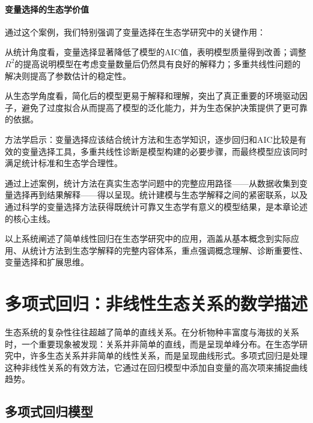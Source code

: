 \documentclass[
  twoside,12pt,fontset=none]{ctexbook}
\begin{document}
\hypertarget{ux53d8ux91cfux9009ux62e9ux7684ux751fux6001ux5b66ux4ef7ux503c}{%
\paragraph{变量选择的生态学价值}\label{ux53d8ux91cfux9009ux62e9ux7684ux751fux6001ux5b66ux4ef7ux503c}}

通过这个案例，我们特别强调了变量选择在生态学研究中的关键作用：

从统计角度看，变量选择显著降低了模型的AIC值，表明模型质量得到改善；调整\(R^2\)的提高说明模型在考虑变量数量后仍然具有良好的解释力；多重共线性问题的解决则提高了参数估计的稳定性。

从生态学角度看，简化后的模型更易于解释和理解，突出了真正重要的环境驱动因子，避免了过度拟合从而提高了模型的泛化能力，并为生态保护决策提供了更可靠的依据。

方法学启示：变量选择应该结合统计方法和生态学知识，逐步回归和AIC比较是有效的变量选择工具，多重共线性诊断是模型构建的必要步骤，而最终模型应该同时满足统计标准和生态学合理性。

通过上述案例，统计方法在真实生态学问题中的完整应用路径------从数据收集到变量选择再到结果解释------得以呈现。统计建模与生态学解释之间的紧密联系，以及通过科学的变量选择方法获得既统计可靠又生态学有意义的模型结果，是本章论述的核心主线。

以上系统阐述了简单线性回归在生态学研究中的应用，涵盖从基本概念到实际应用、从统计方法到生态学解释的完整内容体系，重点强调概念理解、诊断重要性、变量选择和扩展思维。

\hypertarget{ux591aux9879ux5f0fux56deux5f52ux975eux7ebfux6027ux751fux6001ux5173ux7cfbux7684ux6570ux5b66ux63cfux8ff0}{%
\section{多项式回归：非线性生态关系的数学描述}\label{ux591aux9879ux5f0fux56deux5f52ux975eux7ebfux6027ux751fux6001ux5173ux7cfbux7684ux6570ux5b66ux63cfux8ff0}}

生态系统的复杂性往往超越了简单的直线关系。在分析物种丰富度与海拔的关系时，一个重要现象被发现：关系并非简单的直线，而是呈现单峰分布。在生态学研究中，许多生态关系并非简单的线性关系，而是呈现曲线形式。多项式回归是处理这种非线性关系的有效方法，它通过在回归模型中添加自变量的高次项来捕捉曲线趋势。

\hypertarget{ux591aux9879ux5f0fux56deux5f52ux6a21ux578b}{%
\subsection{多项式回归模型}\label{ux591aux9879ux5f0fux56deux5f52ux6a21ux578b}}
\end{document}
